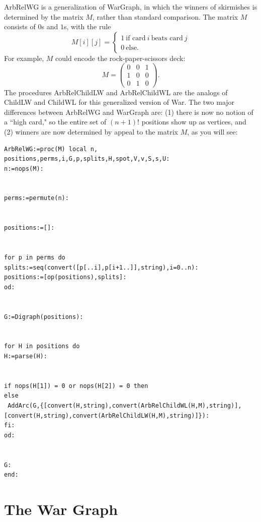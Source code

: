 \documentclass[12pt]{amsart}
\begin{document}
ArbRelWG is a generalization of WarGraph, in which the winners of skirmishes is determined by
the matrix $M$, rather than standard comparison. The matrix $M$ consists of $0$s and $1$s,
with the rule
$$M[i][j] = \begin{cases} 1 \ \text{if card} \ i \ \text{beats card} \ j \\ 0 \ \text{else.} \end{cases} $$
For example, $M$ could encode the rock-paper-scissors deck:
$$M = \begin{pmatrix} 0 & 0 & 1 \\ 1 & 0 & 0 \\ 0 & 1 & 0 \end{pmatrix}.$$
The procedures ArbRelChildLW and ArbRelChildWL are the analogs of ChildLW and ChildWL
for this generalized version of War. The two major differences between ArbRelWG
and WarGraph are: (1) there is now no notion of a ``high card," so the entire set of $(n+1)!$
positions show up as vertices, and (2) winners are now determined by appeal to the matrix $M$, as you will see:


\begin{lstlisting}
ArbRelWG:=proc(M) local n, positions,perms,i,G,p,splits,H,spot,V,v,S,s,U:
n:=nops(M):


perms:=permute(n): 


positions:=[]:


for p in perms do
splits:=seq(convert([p[..i],p[i+1..]],string),i=0..n):
positions:=[op(positions),splits]:
od:


G:=Digraph(positions):


for H in positions do
H:=parse(H):


if nops(H[1]) = 0 or nops(H[2]) = 0 then
else
 AddArc(G,{[convert(H,string),convert(ArbRelChildWL(H,M),string)],
[convert(H,string),convert(ArbRelChildLW(H,M),string)]}):
fi:
od:


G:
end:
\end{lstlisting}


\section{The War Graph}
\label{sec:graph}
\end{document}
